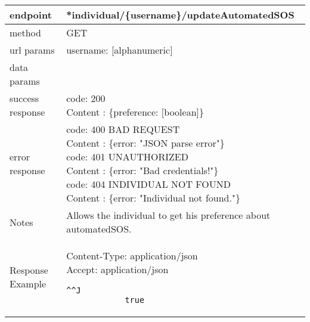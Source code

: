 	\begin{tabularx}{\linewidth}{| l| l }
		\hline
		endpoint & *individual/\{username\}/updateAutomatedSOS \\
		\hline
		method & GET \\
		\hline
		url params & 
		\parbox{0.7\textwidth}{
			\bigskip
			username: [alphanumeric]
			\bigskip
		}\\
		\hline
		data params &
		 \\
		\hline
		success response &
		\parbox{0.7\textwidth}{
			\bigskip
			code: 200 \\
			Content : \{preference: [boolean]\}
			\bigskip
		} \\
		\hline
		error response &
		\parbox{0.7\textwidth}{
			\bigskip
			code: 400 BAD REQUEST \\
			Content : \{error: "JSON parse error"\}\\
			code: 401 UNAUTHORIZED \\
			Content : \{error: "Bad credentials!"\}\\
			code: 404 INDIVIDUAL NOT FOUND \\
			Content : \{error: "Individual not found."\}
			\bigskip
		} \\
		\hline
		Notes & 
		\parbox{0.7\textwidth}{
			\bigskip Allows the individual to get his preference about automatedSOS.
		\bigskip}  \\
		\hline
		Response Example & 
		\parbox{0.8\textwidth}{
		Content-Type: application/json \\
		Accept: application/json \\
		\begin{lstlisting}^^J
			true
	\end{lstlisting}
	} \\
	\hline
	\end{tabularx}
